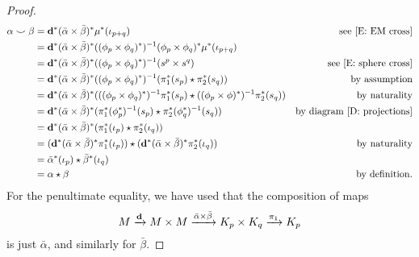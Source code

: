 \begin{proof}
\begin{comment}
Now, we consider the diagram
\begin{diagram}
H^{p+q}(M)&\lTo^{\diag^*(\bar \alpha\times \bar \beta)^*}& H^{p+q}(\mc K_p\times \mc K_q)&\lTo^{\mu^*}&H^{p+q}(\mc K_{p+q})\\
&&\dTo^{(\phi_p\times \phi_q)^*}&&\dTo^{\phi_{p+q}}\\
&&H^{p+q}(S^p\times S^q)&\lTo^{\nu^*}&H^{p+q}(S^{p+q}).
\end{diagram}
As the $p+1$ skeleton of $K_p$ can be taken to be the image of $S^p$ under $\phi_p$, it is standard that the vertical maps are isomorphisms.

Again by \cite[Section 4.3]{Hatc02}, $\mu^*(\iota_{p+q})=\iota_p\times \iota_q$, so $\alpha\smile \beta=\diag^*(\bar \alpha\times \bar \beta)^*(\iota_p\times \iota_q)$. So we compute as follows.
\end{comment}

\begin{align*}
\alpha\smile \beta&=\mathbf{d}^*(\bar \alpha\times \bar \beta)^*\mu^*(\iota_{p+q})&\text{see \eqref{E: EM cross}}\\
&=\mathbf{d}^*(\bar \alpha\times \bar \beta)^*((\phi_p\times \phi_q)^*)^{-1}(\phi_p\times \phi_q)^*\mu^*(\iota_{p+q})\\
&=\mathbf{d}^*(\bar \alpha\times \bar \beta)^*((\phi_p\times \phi_q)^*)^{-1}(s^p\times s^q)&\text{see \eqref{E: sphere cross}}\\
&=\mathbf{d}^*(\bar \alpha\times \bar \beta)^*((\phi_p\times \phi_q)^*)^{-1}(\pi_1^*(s_p) \star \pi_2^*(s_q))&\text{by assumption}\\
&=\mathbf{d}^*(\bar \alpha\times \bar \beta)^*(((\phi_p\times \phi_q)^*)^{-1}\pi_1^*(s_p) \star ((\phi_p\times \phi)^*)^{-1}\pi_2^*(s_q))&\text{by naturality}\\
&=\mathbf{d}^*(\bar \alpha\times \bar \beta)^*(\pi_1^*(\phi_p^*)^{-1}(s_p) \star \pi_2^*(\phi_q^*)^{-1}(s_q))&\text{by diagram \eqref{D: projections}}\\
&=\mathbf{d}^*(\bar \alpha\times \bar \beta)^*(\pi_1^*(\iota_p) \star \pi_2^*(\iota_q))\\
&=(\mathbf{d}^*(\bar \alpha\times \bar \beta)^*\pi_1^*(\iota_p)) \star (\mathbf{d}^*(\bar \alpha\times \bar \beta)^*\pi_2^*(\iota_q))&\text{by naturality}\\
&=\bar\alpha^*(\iota_p) \star \bar\beta^*(\iota_q)\\
&=\alpha\star\beta &\text{by definition}.
\end{align*}
For the penultimate equality, we have used that the composition of maps $$M\xrightarrow{\mathbf{d}}M\times M\xrightarrow{\bar\alpha\times \bar \beta}K_p\times K_q\xrightarrow{\pi_1}K_p$$ is just $\bar \alpha$, and similarly for $\bar \beta$.
\end{proof}


